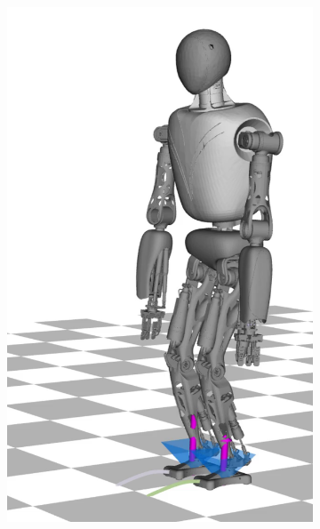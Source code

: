 \begin{figure}
\begin{subfigure}{.16\textwidth}
	\includegraphics[width=.95\linewidth]{fig/walkDynamic/snaps/1}
	\caption{}
\end{subfigure}%
\begin{subfigure}{.16\textwidth}

\end{subfigure}
\end{figure}
